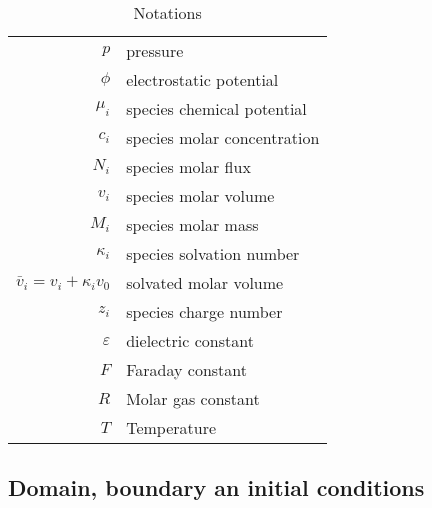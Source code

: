 \documentclass[12pt,oneside,reqno]{amsart}
\numberwithin{equation}{section}
\begin{document}
\begin{table}
  \begin{tabular}{rl}
    $p$ & pressure\\
    $\phi $ &electrostatic potential\\
    $\mu_i$& species chemical potential\\
    $c_i$& species molar concentration\\
    $N_i$& species molar flux\\
    $v_i$ & species molar volume\\ 
    $M_i$ & species molar mass\\
    $\kappa_i$ & species solvation number\\
    $\bar v_i = v_i + \kappa_i v_0$ & solvated molar volume\\
    $z_i$ & species charge number\\
    $\varepsilon$& dielectric constant\\
    $F$ & Faraday constant\\
    $R$ & Molar gas constant\\
    $T$ & Temperature
  \end{tabular}
  \medskip
  
  \caption{Notations}
  \label{tab:notations}
\end{table}

\subsection{Domain, boundary an initial conditions} 
\end{document}
